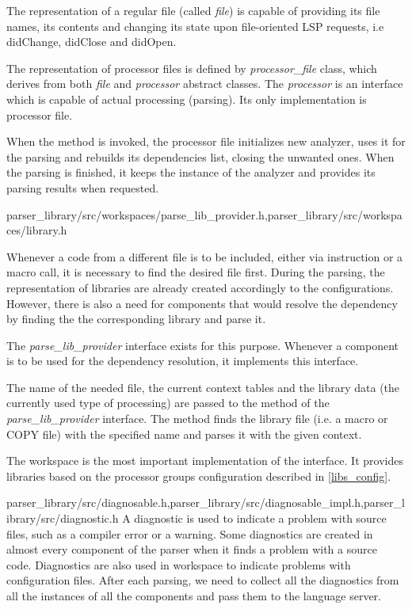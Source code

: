 The representation of a regular file (called \emph{file}) is capable of providing its file names, its contents and changing its state upon file-oriented LSP requests, i.e didChange, didClose and didOpen.

The representation of processor files is defined by \emph{processor\_file} class, which derives from both \emph{file} and \emph{processor} abstract classes. The \emph{processor} is an interface which is capable of actual processing (parsing). Its only implementation is processor file.

When the  method is invoked, the processor file initializes new analyzer, uses it for the parsing and rebuilds its dependencies list, closing the unwanted ones. When the parsing is finished, it keeps the instance of the analyzer and provides its parsing results when requested.

{parser\_library/src/workspaces/parse\_lib\_provider.h,parser\_library/src/workspaces/library.h}

Whenever a code from a different file is to be included, either via  instruction or a macro call, it is necessary to find the desired file first. During the parsing, the representation of libraries are already created accordingly to the configurations. However, there is also a need for components that would resolve the dependency by finding the the corresponding library and parse it.

The \emph{parse\_lib\_provider} interface exists for this purpose. Whenever a component is to be used for the dependency resolution, it implements this interface.

The name of the needed file, the current context tables and the library data (the currently used type of processing) are passed to the  method of the \emph{parse\_lib\_provider} interface. The method finds the library file (i.e. a macro or COPY file) with the specified name and parses it with the given context.

The workspace is the most important implementation of the  interface. It provides libraries based on the processor groups configuration described in \cref{libs_config}.


{parser\_library/src/diagnosable.h,parser\_library/src/diagnosable\_impl.h,parser\_library/src/diagnostic.h}
A diagnostic is used to indicate a problem with source files, such as a compiler error or a warning. Some diagnostics are created in almost every component of the parser when it finds a problem with a source code. Diagnostics are also used in workspace to indicate problems with configuration files. After each parsing, we need to collect all the diagnostics from all the instances of all the components and pass them to the language server.

